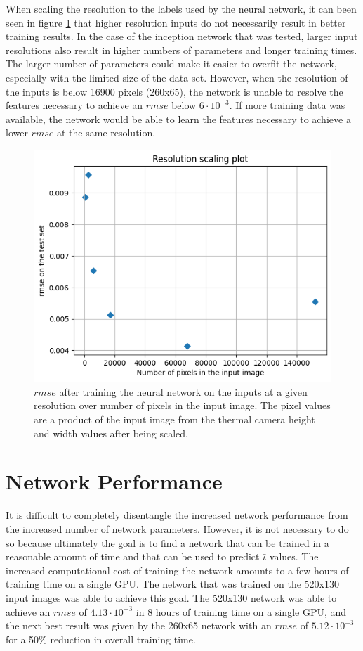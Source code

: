 When scaling the resolution to the labels used by the neural network, it can been seen in figure \ref{fig:resolution-scaling} that higher resolution inputs do not necessarily result in better training results. In the case of the inception network that was tested, larger input resolutions also result in higher numbers of parameters and longer training times. The larger number of parameters could make it easier to overfit the network, especially with the limited size of the data set. However, when the resolution of the inputs is below 16900 pixels (260x65), the network is unable to resolve the features necessary to achieve an $rmse$ below $6 \cdot 10^{-3}$. If more training data was available, the network would be able to learn the features necessary to achieve a lower $rmse$ at the same resolution.

\begin{figure}[!htb]
    \centering
    \includegraphics[width = \textwidth]{images/resolution-scaling.png}
    \caption{$rmse$ after training the neural network on the inputs at a given resolution over number of pixels in the input image. The pixel values are a product of the input image from the thermal camera height and width values after being scaled.} \label{fig:resolution-scaling}
\end{figure}

\section{Network Performance}

It is difficult to completely disentangle the increased network performance from the increased number of network parameters. However, it is not necessary to do so because ultimately the goal is to find a network that can be trained in a reasonable amount of time and that can be used to predict $\bar{\iota}$ values. The increased computational cost of training the network amounts to a few hours of training time on a single GPU. The network that was trained on the 520x130 input images was able to achieve this goal. The 520x130 network was able to achieve an $rmse$ of $4.13 \cdot 10^{-3}$ in 8 hours of training time on a single GPU, and the next best result was given by the 260x65 network with an $rmse$ of $5.12 \cdot 10^{-3}$ for a 50\% reduction in overall training time.

